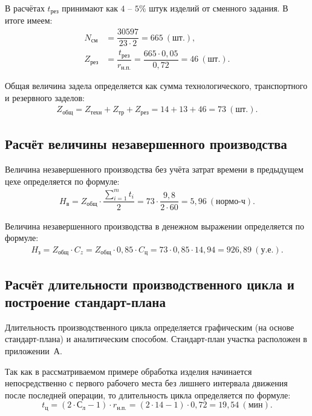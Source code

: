 В расчётах $ t_{\text{рез}} $ принимают как $4$ -- $5\%$ штук изделий от сменного
задания. В итоге имеем:
\begin{align*}
  N_{\text{см}} &= \dfrac{30597}{23 \cdot 2} = 665~(\text{шт.}), \\
  Z_{\text{рез}} &= \dfrac{t_{\text{рез}}}{r_{\text{н.п.}}} = \dfrac{665 \cdot 0{,}05}{0{,}72} = 46~(\text{шт.}).
\end{align*}

Общая величина задела определяется как сумма технологического, транспортного и
резервного заделов:
\begin{align*}
  Z_{\text{общ}} = Z_{\text{техн}} + Z_{\text{тр}} + Z_{\text{рез}} = 14 + 13 + 46 = 73~(\text{шт.}).
\end{align*}


\subsection{Расчёт величины незавершенного производства}

Величина незавершенного производства без учёта затрат времени в предыдущем цехе
определяется по формуле:
\begin{align*}
  H_{\text{в}} = Z_{\text{общ}} \cdot \dfrac{\sum\limits_{i=1}^m t_i}{2} = 73 \cdot \dfrac{9{,}8}{2 \cdot 60} = 5{,}96~(\text{нормо-ч}).
\end{align*}

Величина незавершенного производства в денежном выражении определяется по формуле:
\begin{align*}
  H_{\text{з}} = Z_{\text{общ}} \cdot C_z = Z_{\text{общ}} \cdot 0{,}85 \cdot C_{\text{ц}} =
  73 \cdot 0{,}85 \cdot 14{,}94 = 926{,}89~(\text{у.е.}).
\end{align*}

\subsection{Расчёт длительности производственного цикла и построение стандарт-плана}

Длительность производственного цикла определяется графическим (на основе
стандарт-плана) и аналитическим способом. Стандарт-план участка
расположен в приложении~А.

Так как в рассматриваемом примере обработка изделия начинается непосредственно
с первого рабочего места без лишнего интервала движения после последней операции,
то длительность цикла определяется по формуле:
\begin{equation*}
  t_\text{ц} = (2 \cdot \text{С}_{\text{л}} - 1) \cdot r_{\text{н.п.}} = (2 \cdot 14 - 1) \cdot 0{,}72 = 19{,}54~(\text{мин}).
\end{equation*}

